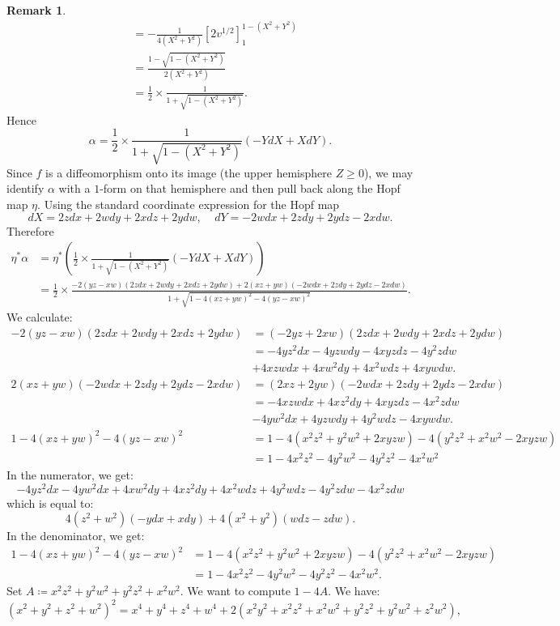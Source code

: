 \documentclass{article}
\theoremstyle{plain}
\theoremstyle{definition}
\newtheorem{rem}[thm]{Remark}
\begin{document}
\begin{rem}
\begin{align*}
& = -\frac{1}{4(X^2+Y^2)} \left[2v^{1/2}\right]^{1-(X^2+Y^2)}_1 \\
& = \frac{1 - \sqrt{1-(X^2+Y^2)}}{2(X^2+Y^2)} \\
& = \frac{1}{2} \times \frac{1}{1+\sqrt{1-(X^2+Y^2)}}.
\end{align*}
Hence
\[
\alpha = \frac{1}{2} \times \frac{1}{1+\sqrt{1-(X^2+Y^2)}}(-YdX + XdY).
\]
Since $f$ is a diffeomorphism onto its image (the upper hemisphere $Z \geq 0$), we may identify $\alpha$ with a $1$-form on that hemisphere and then pull back along the Hopf map $\eta$. Using the standard coordinate expression for the Hopf map
\[
dX = 2zdx+2wdy+2xdz+2ydw, ~~~~~ dY = -2wdx+2zdy+2ydz-2xdw.
\]
Therefore
\begin{align*}
\eta^\ast\alpha & = \eta^\ast\left(\frac{1}{2} \times \frac{1}{1+\sqrt{1-(X^2+Y^2)}}(-YdX + XdY)\right) \\
& = \frac{1}{2} \times \frac{-2(yz-xw)(2zdx+2wdy+2xdz+2ydw) + 2(xz+yw)(-2wdx+2zdy+2ydz-2xdw)}{1 + \sqrt{1 - 4(xz+yw)^2 - 4(yz-xw)^2}}.
\end{align*}
We calculate:
\begin{align*}
-2(yz-xw)(2zdx+2wdy+2xdz+2ydw) & = (-2yz+2xw)(2zdx+2wdy+2xdz+2ydw) \\
& = -4yz^2dx-4yzwdy-4xyzdz-4y^2zdw \\
& + 4xzwdx+4xw^2dy+4x^2wdz+4xywdw. \\
2(xz+yw)(-2wdx+2zdy+2ydz-2xdw) & = (2xz+2yw)(-2wdx+2zdy+2ydz-2xdw) \\
& = -4xzwdx+4xz^2dy+4xyzdz-4x^2zdw \\
& -4yw^2dx+4yzwdy+4y^2wdz-4xywdw. \\
1 - 4(xz+yw)^2 - 4(yz-xw)^2 & = 1 - 4(x^2z^2+y^2w^2+2xyzw) - 4(y^2z^2+x^2w^2-2xyzw) \\
& = 1-4x^2z^2-4y^2w^2-4y^2z^2-4x^2w^2
\end{align*}
In the numerator, we get:
\[
-4yz^2dx-4yw^2dx+4xw^2dy+4xz^2dy+4x^2wdz+4y^2wdz-4y^2zdw-4x^2zdw
\]
which is equal to:
\[
4(z^2+w^2)(-ydx+xdy)+4(x^2+y^2)(wdz-zdw).
\]
In the denominator, we get:
\begin{align*}
1 - 4(xz+yw)^2 - 4(yz-xw)^2 & = 1 - 4(x^2z^2+y^2w^2+2xyzw) - 4(y^2z^2+x^2w^2-2xyzw) \\
& = 1-4x^2z^2-4y^2w^2-4y^2z^2-4x^2w^2.
\end{align*}
Set $A \coloneq x^2z^2+y^2w^2+y^2z^2+x^2w^2$. We want to compute $1-4A$. We have:
\begin{equation}\label{1-4a}
(x^2+y^2+z^2+w^2)^2 = x^4+y^4+z^4+w^4+2(x^2y^2+x^2z^2+x^2w^2+y^2z^2+y^2w^2+z^2w^2),

\end{equation}
\end{rem}
\end{document}
